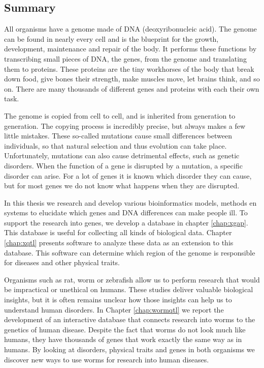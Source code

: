 \begin{appendices}

\chapter{Summary}
All organisms have a genome made of DNA (deoxyribonucleic acid).
The genome can be found in nearly every cell and is the blueprint for the growth, development, maintenance and repair of the body.
It performs these functions by transcribing small pieces of DNA, the genes, from the genome and translating them to proteins.
These proteins are the tiny workhorses of the body that break down food, give bones their strength, make muscles move, let brains think, and so on.
There are many thousands of different genes and proteins with each their own task.

The genome is copied from cell to cell, and is inherited from generation to generation.
The copying process is incredibly precise, but always makes a few little mistakes.
These so-called mutations cause small differences between individuals, so that natural selection and thus evolution can take place.
Unfortunately, mutations can also cause detrimental effects, such as genetic disorders.
When the function of a gene is disrupted by a mutation, a specific disorder can arise.
For a lot of genes it is known which disorder they can cause, but for most genes we do not know what happens when they are disrupted.

In this thesis we research and develop various bioinformatics models, methods en systems to elucidate which genes and DNA differences can make people ill.
To support the research into genes, we develop a database in chapter \ref{chap:xgap}.
This database is useful for collecting all kinds of biological data.
Chapter \ref{chap:xqtl} presents software to analyze these data as an extension to this database.
This software can determine which region of the genome is responsible for diseases and other physical traits.

Organisms such as rat, worm or zebrafish allow us to perform research that would be impractical or unethical on humans.
These studies deliver valuable biological insights, but it is often remains unclear how those insights can help us to understand human disorders.
In Chapter \ref{chap:wormqtl} we report the development of an interactive database that connects research into worms to the genetics of human disease.
Despite the fact that worms do not look much like humans, they have thousands of genes that work exactly the same way as in humans.
By looking at disorders, physical traits and genes in both organisms we discover new ways to use worms for research into human diseases.


\end{appendices}

